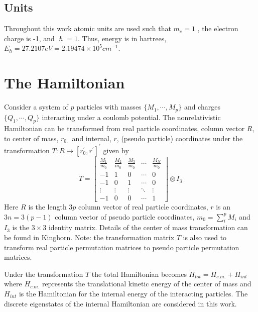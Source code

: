 \documentclass[12pt,thmsa,suthesis,verbatim]{report}
\begin{document}
\subsection{Units}

Throughout this work atomic units are used such that $m_e=1$ , the electron
charge is -1, and $\hslash =1$. Thus, energy is in hartrees, $%
E_h=27.2107eV=2.19474\times 10^5cm^{-1}$.

\section{The Hamiltonian}

Consider a system of $p$ particles with masses $\{M_1,\cdots ,M_p\}$ and
charges $\{Q_1,\cdots ,Q_p\}$ interacting under a coulomb potential. The
nonrelativistic Hamiltonian can be transformed from real particle
coordinates, column vector $R$, to center of mass, $r_{0\text{, }}$ and
internal, $r$, (pseudo particle) coordinates under the transformation $%
T:R\mapsto [r_0^{\prime },r^{\prime }]^{\prime }$ given by 
\begin{equation}
T=\left[ 
\begin{array}{ccccc}
\frac{M_1}{m_0} & \frac{M_2}{m_0} & \frac{M_3}{m_0} & \cdots & \frac{M_N}{m_0%
} \\ 
-1 & 1 & 0 & \cdots & 0 \\ 
-1 & 0 & 1 & \cdots & 0 \\ 
\vdots & \vdots & \vdots & \ddots & \vdots \\ 
-1 & 0 & 0 & \cdots & 1
\end{array}
\right] \otimes I_3  \label{tranT}
\end{equation}
Here $R$ is the length $3p$ column vector of real particle coordinates, $r$
is an $3n=3\left( p-1\right) $ column vector of pseudo particle coordinates, 
$m_0=\sum_i^pM_i$ and $I_3$ is the $3\times 3$ identity matrix. Details of
the center of mass transformation can be found in Kinghorn\cite{Kinghorn93}.
Note: the transformation matrix $T$ is also used to transform real particle
permutation matrices to pseudo particle permutation matrices.

Under the transformation $T$ the total Hamiltonian becomes $%
H_{tot}=H_{c.m.}+H_{int}$ where $H_{c.m.}$ represents the translational
kinetic energy of the center of mass and $H_{int}$ is the Hamiltonian for
the internal energy of the interacting particles. The discrete eigenstates
of the internal Hamiltonian are considered in this work.
\end{document}
